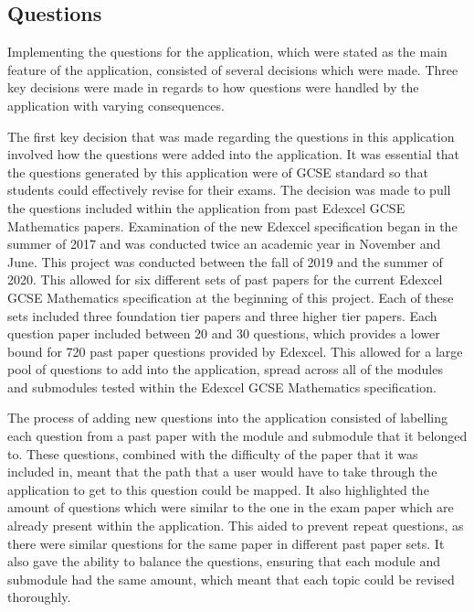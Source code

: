 \documentclass{article}
\begin{document}
\subsection{Questions}

Implementing the questions for the application, which were stated as the main feature of the application, consisted of several decisions which were made. Three key decisions were made in regards to how questions were handled by the application with varying consequences. \par

The first key decision that was made regarding the questions in this application involved how the questions were added into the application. It was essential that the questions generated by this application were of GCSE standard so that students could effectively revise for their exams. The decision was made to pull the questions included within the application from past Edexcel GCSE Mathematics papers. Examination of the new Edexcel specification began in the summer of 2017 and was conducted twice an academic year in November and June. This project was conducted between the fall of 2019 and the summer of 2020. This allowed for six different sets of past papers for the current Edexcel GCSE Mathematics specification at the beginning of this project. Each of these sets included three foundation tier papers and three higher tier papers. Each question paper included between 20 and 30 questions, which provides a lower bound for 720 past paper questions provided by Edexcel. This allowed for a large pool of questions to add into the application, spread across all of the modules and submodules tested within the Edexcel GCSE Mathematics specification. \par

The process of adding new questions into the application consisted of labelling each question from a past paper with the module and submodule that it belonged to. These questions, combined with the difficulty of the paper that it was included in, meant that the path that a user would have to take through the application to get to this question could be mapped. It also highlighted the amount of questions which were similar to the one in the exam paper which are already present within the application. This aided to prevent repeat questions, as there were similar questions for the same paper in different past paper sets. It also gave the ability to balance the questions, ensuring that each module and submodule had the same amount, which meant that each topic could be revised thoroughly. \par
\end{document}
